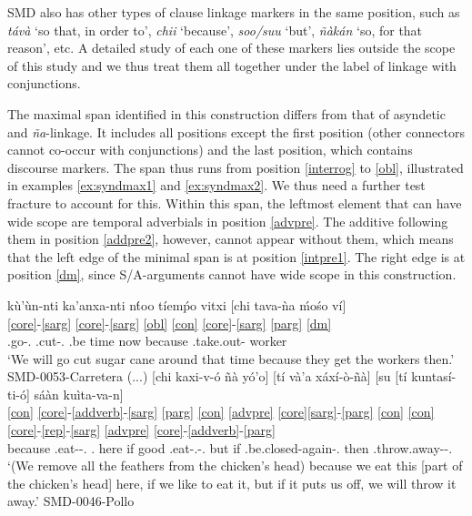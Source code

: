 \documentclass[output=paper]{langscibook}
\begin{document}
SMD also has other types of clause linkage markers in the same position, such as  \textit{távà} `so that, in order to', \textit{chii} `because', \textit{soo/suu} `but', \textit{ñàkán} `so, for that reason', etc. A detailed study of each one of these markers lies outside the scope of this study and we thus treat them all together under the label of linkage with conjunctions.

The maximal span identified in this construction differs from that of asyndetic and \textit{ña}-linkage. It includes all positions except the first position (other connectors cannot co-occur with conjunctions) and the last position, which contains discourse markers. The span thus runs from position \ref{interrog} to \ref{obl}, illustrated in examples \ref{ex:syndmax1} and \ref{ex:syndmax2}. We thus need a further test fracture to account for this.
Within this span, the leftmost element that can have wide scope are temporal adverbials in position \ref{advpre}. The additive following them in position \ref{addpre2}, however, cannot appear without them, which means that the left edge of the minimal span is at position \ref{intpre1}.
The right edge is at position \ref{dm}, since S/A-arguments cannot have wide scope in this construction.

\ea
 \ea \label{ex:syndmax1}
    \glll kù'ùn-nti ka'anxa-nti nt́oo tíemṕo vitxi [chi tava-ǹa ḿośo ví] \\
         \ref{core}-\ref{sarg} \ref{core}-\ref{sarg} \ref{obl} {} {} \ref{con} \ref{core}-\ref{sarg} \ref{parg} \ref{dm}  \\
        \Pot.go-\Fpl.\Excl{} \Pot.cut-\Fpl.\Excl{} \Incmpl.be time now because \Pot.take.out-\Tpl{} worker \Dm{} \\
    \glt `We will go cut sugar cane around that time because they get the workers then.' \hfill SMD-0053-Carretera
 \ex \label{ex:syndmax2}
    \glll  (...) [chi kaxi-v-ó ñà yó'o] [tí và'a xáxí-ò-ñà]  [su [tí kuntasí-ti-ó] sáàn kuìta-va-n] \\
        \ref{con} \ref{core}-\ref{addverb}-\ref{sarg} \ref{parg} {} \ref{con} \ref{advpre} \ref{core}\ref{sarg}-\ref{parg} \ref{con} \ref{con} \ref{core}-\ref{rep}-\ref{sarg} \ref{advpre} \ref{core}-\ref{addverb}-\ref{parg}\\
        because \Pot.eat-\Add-\Fpl.\Incl{} \Clf.\Thing{} here if good \Incmpl.eat-\Fpl.\Incl-\Tsg.\Thing{} but if \Pot.be.closed-again-\Fpl.\Incl{} then \Pot.throw.away-\Add-\Tsg.\Thing{} \\
    \glt `(We remove all the feathers from the chicken's head) because we eat this [part of the chicken's head] here, if we like to eat it, but if it puts us off, we will throw it away.' \hfill SMD-0046-Pollo
 \z
\z
\end{document}
